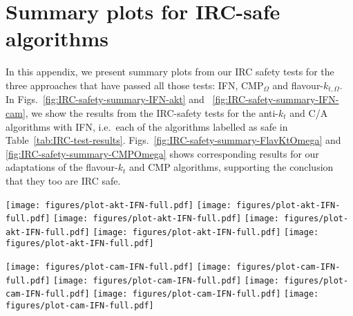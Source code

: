 \documentclass[nofootinbib,twocolumn,preprintnumbers,superscriptaddress,aps]{revtex4-2}
\newcommand{\as}{\alpha_s}
\begin{document}
\section{Summary plots for IRC-safe algorithms}
\label{sec:final-summary-plots}

In this appendix, we present summary plots from our IRC safety tests
for the three approaches that have passed all those tests:
IFN, CMP$_\Omega$ and flavour-$k_{t,\Omega}$.
%
In Figs.~\ref{fig:IRC-safety-summary-IFN-akt} and
~\ref{fig:IRC-safety-summary-IFN-cam}, we show the results from the 
IRC-safety tests for the anti-$k_t$ and C/A algorithms with IFN, i.e.\ each
of the algorithms labelled as safe in Table~\ref{tab:IRC-test-results}.
%
Figs.~\ref{fig:IRC-safety-summary-FlavKtOmega} and \ref{fig:IRC-safety-summary-CMPOmega} shows corresponding results
for our adaptations of the flavour-$k_t$ and CMP algorithms,
supporting the conclusion that they too are IRC safe.

\begin{figure*}
  \centering
  \texttt{[image: figures/plot-akt-IFN-full.pdf]}
  \texttt{[image: figures/plot-akt-IFN-full.pdf]}
  \texttt{[image: figures/plot-akt-IFN-full.pdf]}
  \texttt{[image: figures/plot-akt-IFN-full.pdf]}
  \texttt{[image: figures/plot-akt-IFN-full.pdf]}
  \texttt{[image: figures/plot-akt-IFN-full.pdf]}
  \\
  \caption{Summary of IRC safety test results at
    orders $\as$ to $\as^6$ for the anti-$k_t$
    algorithm with IFN.
  }
  \label{fig:IRC-safety-summary-IFN-akt}
\end{figure*}

\begin{figure*}
  \centering
  \texttt{[image: figures/plot-cam-IFN-full.pdf]}
  \texttt{[image: figures/plot-cam-IFN-full.pdf]}
  \texttt{[image: figures/plot-cam-IFN-full.pdf]}
  \texttt{[image: figures/plot-cam-IFN-full.pdf]}
  \texttt{[image: figures/plot-cam-IFN-full.pdf]}
  \texttt{[image: figures/plot-cam-IFN-full.pdf]}
  \\
  \caption{Same as Fig.~\ref{fig:IRC-safety-summary-IFN-akt}, for the
    C/A algorithm with IFN.
  }
  \label{fig:IRC-safety-summary-IFN-cam}
\end{figure*}
\end{document}
